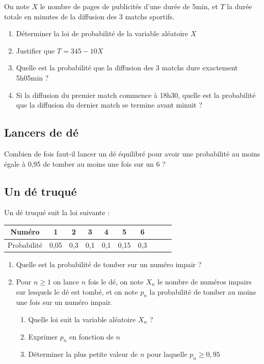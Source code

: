 \documentclass[oneside,12pt]{article}          %
\begin{document}
On note $X$ le nombre de pages de publicités d'une durée de 5min, et $T$ la durée totale en minutes de la diffusion des 3 matchs sportifs.
\begin{enumerate}
    \item Déterminer la loi de probabilité de la variable aléatoire $X$
    \item Justifier que $T=345-10X$
    \item Quelle est la probabilité que la diffusion des 3 matchs dure exactement 5h05min ?
    \item Si la diffusion du premier match commence à 18h30, quelle est la probabilité que la diffusion du dernier match se termine avant minuit ?
\end{enumerate}




\subsection{Lancers de dé}
Combien de fois faut-il lancer un dé équilibré pour avoir une probabilité au moins égale à 0,95 de tomber au moins une fois sur un 6 ?



\subsection{Un dé truqué}
Un dé truqué suit la loi suivante :

\renewcommand{\arraystretch}{1.5}
\setlength{\tabcolsep}{15pt}
\begin{center}
\begin{tabular}{|c|c|c|c|c|c|c|c|c|c|} \hline
Numéro & 1 & 2 & 3 & 4 & 5 & 6 \\ \hline
Probabilité & 0,05 & 0,3 & 0,1 & 0,1 & 0,15 & 0,3\\ \hline 
\end{tabular}
\end{center}

\begin{enumerate}
    \item Quelle est la probabilité de tomber sur un numéro impair ?
    \item Pour $n\geq1$ on lance $n$ fois le dé, on note $X_n$ le nombre de numéros impairs sur lesquels le dé est tombé, et on note $p_n$ la probabilité de tomber au moins une fois sur un numéro impair.
    \begin{enumerate}
        \item Quelle loi suit la variable aléatoire $X_n$ ?
        \item Exprimer $p_n$ en fonction de $n$
        \item Déterminer la plus petite valeur de $n$ pour laquelle $p_n\geq0,95$
    \end{enumerate}
\end{enumerate}
\end{document}
